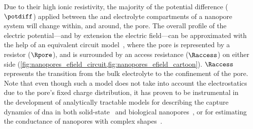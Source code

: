 Due to their high ionic resistivity, the majority of the potential difference ($\potdiff$) applied between the
\cisi{} and \transi{} electrolyte compartments of a nanopore system will change within, and around, the pore.
The overall profile of the electric potential---and by extension the electric field---can be approximated with
the help of an equivalent circuit model~\cite{Wanunu-2009,Grosberg-2010,Kowalczyk-2011}, where the pore is
represented by a resistor ($\Rpore$), and is surrounded by an access resistance ($\Raccess$) on either side
(\cref{fig:nanopores_efield_circuit,fig:nanopores_efield_cartoon}). $\Raccess$ represents the transition from
the bulk electrolyte to the confinement of the pore. Note that even though such a model does not take into
account the electrostatics due to the pore's fixed charge distribution, it has proven to be instrumental in
the development of analytically tractable models for describing the capture dynamics of \gls{dna} in both
solid-state~\cite{Wanunu-2009,Grosberg-2010,Muthukumar-2010} and biological
nanopores~\cite{Chinappi-2015,Nomidis-2018}, or for estimating the conductance of nanopores with complex
shapes~\cite{Wanunu-2009,Kowalczyk-2011}.

